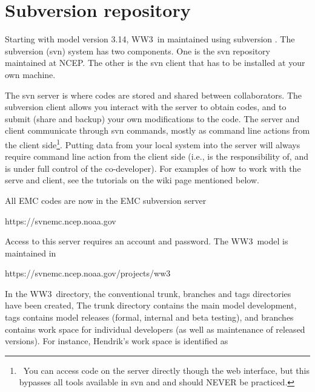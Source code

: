 \documentclass[12pt]{article}
\newcommand{\ws}{WW3}
\newcommand{\file}{\sf}
\newcommand{\newsec}{\setcounter{equation}{0}
                      \setcounter{myfigno}{0}
                      \setcounter{mytabno}{0}}
\newcounter{myfigno}[section]
\newcounter{mytabno}[section]
\begin{document}
\section{Subversion repository} \label{sec:svn}
\newsec

Starting with model version 3.14, \ws\ in maintained using subversion
\citep{bk:CSea06}. The subversion (svn) system has two components. One is the
svn repository maintained at NCEP. The other is the svn client that has to be
installed at your own machine. 

The svn server is where codes are stored and shared between collaborators. The
subversion client allows you interact with the server to obtain codes, and to
submit (share and backup) your own modifications to the code. The server and
client communicate through svn commands, mostly as command line actions from
the client side\footnote{~You can access code on the server directly though
the web interface, but this bypasses all tools available in svn and and should
NEVER be practiced.}. Putting data from your local system into the server will
always require command line action from the client side (i.e., is the
responsibility of, and is under full control of the co-developer). For
examples of how to work with the serve and client, see the tutorials on the
wiki page mentioned below.

\vspace{\baselineskip} \noindent
All EMC codes are now in the EMC subversion server

\vspace{\baselineskip}
\centerline{\file https://svnemc.ncep.noaa.gov}
\vspace{\baselineskip}

\noindent
Access to this server requires an account and password. The \ws\ model is
maintained in

\vspace{\baselineskip}
\centerline{\file https://svnemc.ncep.noaa.gov/projects/ww3}
\vspace{\baselineskip}

\noindent
In the \ws\ directory, the conventional {\file trunk}, {\file branches} and
{\file tags} directories have been created, The {\file trunk} directory
contains the main model development, {\file tags} contains model releases
(formal, internal and beta testing), and {\file branches} contains work space
for individual developers (as well as maintenance of released versions). For
instance, Hendrik's work space is identified as
\end{document}

